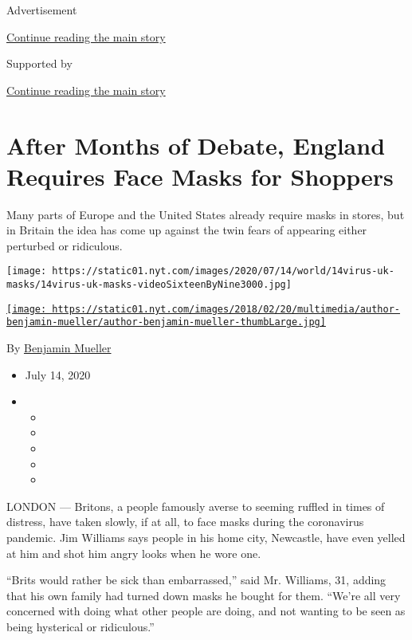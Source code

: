 Advertisement

\protect\hyperlink{after-top}{Continue reading the main story}

Supported by

\protect\hyperlink{after-sponsor}{Continue reading the main story}

\hypertarget{after-months-of-debate-england-requires-face-masks-for-shoppers}{%
\section{After Months of Debate, England Requires Face Masks for
Shoppers}\label{after-months-of-debate-england-requires-face-masks-for-shoppers}}

Many parts of Europe and the United States already require masks in
stores, but in Britain the idea has come up against the twin fears of
appearing either perturbed or ridiculous.

\texttt{[image: https://static01.nyt.com/images/2020/07/14/world/14virus-uk-masks/14virus-uk-masks-videoSixteenByNine3000.jpg]}

\href{https://www.nytimes.com/by/benjamin-mueller}{\texttt{[image: https://static01.nyt.com/images/2018/02/20/multimedia/author-benjamin-mueller/author-benjamin-mueller-thumbLarge.jpg]}}

By \href{https://www.nytimes.com/by/benjamin-mueller}{Benjamin Mueller}

\begin{itemize}
\item
  July 14, 2020
\item
  \begin{itemize}
  \item
  \item
  \item
  \item
  \item
  \end{itemize}
\end{itemize}

LONDON --- Britons, a people famously averse to seeming ruffled in times
of distress, have taken slowly, if at all, to face masks during the
coronavirus pandemic. Jim Williams says people in his home city,
Newcastle, have even yelled at him and shot him angry looks when he wore
one.

``Brits would rather be sick than embarrassed,'' said Mr. Williams, 31,
adding that his own family had turned down masks he bought for them.
``We're all very concerned with doing what other people are doing, and
not wanting to be seen as being hysterical or ridiculous.''

